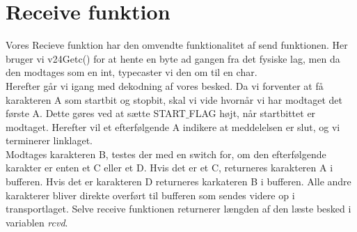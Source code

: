 \clearpage
\section{Receive funktion}

Vores Recieve funktion har den omvendte funktionalitet af send funktionen. Her bruger vi v24Getc() for at hente en byte ad gangen fra det fysiske lag, men da den modtages som en int, typecaster vi den om til en char.\\ Herefter går vi igang med dekodning af vores besked. Da vi forventer at få karakteren A som startbit og stopbit, skal vi vide hvornår vi har modtaget det første A. Dette gøres ved at sætte START$\_$FLAG højt, når startbittet er modtaget. Herefter vil et efterfølgende A indikere at meddelelsen er slut, og vi terminerer linklaget.\\ 
Modtages karakteren B, testes der med en switch for, om den efterfølgende karakter er enten et C eller et D. Hvis det er et C, returneres karakteren A i bufferen. Hvis det er karakteren D returneres karkateren B i bufferen. Alle andre karakterer bliver direkte overført til bufferen som sendes videre op i transportlaget. Selve receive funktionen returnerer længden af den læste besked i variablen \textit{rcvd}.
